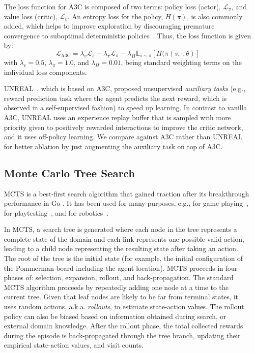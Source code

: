 \documentclass[letterpaper]{article}
\begin{document}
The loss function for A3C is composed of two terms: policy loss (actor), $\mathcal{L}_{\pi}$, and value loss (critic), $\mathcal{L}_{v}$. An entropy loss for the policy, $H(\pi)$, is also commonly added, which helps to improve exploration by discouraging premature convergence to suboptimal deterministic policies~\cite{mnih2016asynchronous}. Thus, the loss function is given by: $$\mathcal{L}_{\text{A3C}} = \lambda_v  \mathcal{L}_{v} + \lambda_{\pi} \mathcal{L}_{\pi} - \lambda_{H} \mathbb{E}_{s \sim \pi} [H(\pi(s, \cdot, \theta)] $$ with $\lambda_{v}=0.5$, $\lambda_{\pi}=1.0$, and $\lambda_{H}=0.01$, being standard weighting terms on the individual loss components.

UNREAL~\cite{jaderberg2016reinforcement}, which is based on A3C, proposed unsupervised \emph{auxiliary tasks} (e.g., reward prediction task where the agent predicts the next reward, which is observed in a self-supervised fashion) to speed up learning. In contrast to vanilla A3C, UNREAL uses an experience replay buffer that is sampled with more priority given to positively rewarded interactions to improve the critic network, and it uses off-policy learning. We compare against A3C rather than UNREAL for better ablation by just augmenting the auxiliary task on top of A3C.


\subsection{Monte Carlo Tree Search}

MCTS is a best-first search algorithm that gained traction after its breakthrough performance in Go \cite{coulom2006efficient}. It has been used for many purposes, e.g., for game playing~\cite{sturtevant2015monte,silver2016mastering}, for playtesting~\cite{zook2015monte,holmgaard2018automated,borovikov2019winning}, and for robotics~\cite{kartal2015stochastic,best2019dec}.

In MCTS, a search tree is generated where each node in the tree represents a complete state of the domain and each link represents one possible valid action, leading to a child node representing the resulting state after taking an action. The root of the tree is the initial state (for example, the initial configuration of the Pommerman board including the agent location).
MCTS proceeds in four phases of: selection, expansion, rollout, and back-propagation. The standard MCTS algorithm proceeds by repeatedly adding one node at a time to the current tree. Given that leaf nodes are likely to be far from terminal states, it uses random actions, a.k.a. \textit{rollouts}, to estimate state-action values. The rollout policy can also be biased based on information obtained during search, or external domain knowledge. After the rollout phase, the total collected rewards during the episode is back-propagated through the tree branch, updating their empirical state-action values, and visit counts.
\end{document}
